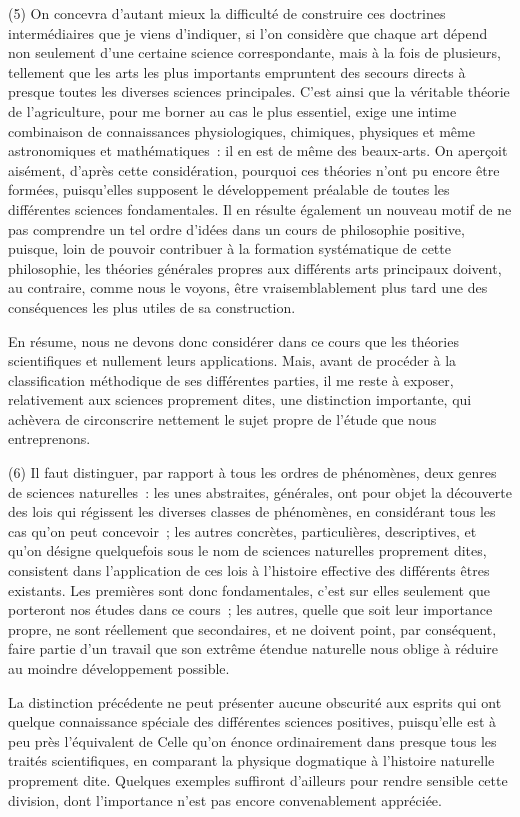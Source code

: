 \documentclass[french,twoside]{book} %
\begin{document}
(5) On concevra d’autant mieux la difficulté de construire ces doctrines intermédiaires que je viens d’indiquer, si l’on considère que chaque art dépend non seulement d’une certaine science correspondante, mais à la fois de plusieurs, tellement que les arts les plus importants empruntent des secours directs à presque toutes les diverses sciences principales. C’est ainsi que la véritable théorie de l’agriculture, pour me borner au cas le plus essentiel, exige une intime combinaison de connaissances physiologiques, chimiques, physiques et même astronomiques et mathématiques : il en est de même des beaux-arts. On aperçoit aisément, d’après cette considération, pourquoi ces théories n’ont pu encore être formées, puisqu’elles supposent le développement préalable de toutes les différentes sciences fondamentales. Il en résulte également un nouveau motif de ne pas comprendre un tel ordre d’idées dans un cours de philosophie positive, puisque, loin de pouvoir contribuer à la formation systématique de cette philosophie, les théories générales propres aux différents arts principaux doivent, au contraire, comme nous le voyons, être vraisemblablement plus tard une des conséquences les plus utiles de sa construction.\par
En résume, nous ne devons donc considérer dans ce cours que les théories scientifiques et nullement leurs applications. Mais, avant de procéder à la classification méthodique de ses différentes parties, il me reste à exposer, relativement aux sciences proprement dites, une distinction importante, qui achèvera de circonscrire nettement le sujet propre de l’étude que nous entreprenons.\par
(6) Il faut distinguer, par rapport à tous les ordres de phénomènes, deux genres de sciences naturelles : les unes abstraites, générales, ont pour objet la découverte des lois qui régissent les diverses classes de phénomènes, en considérant tous les cas qu’on peut concevoir ; les autres concrètes, particulières, descriptives, et qu’on désigne quelquefois sous le nom de sciences naturelles proprement dites, consistent dans l’application de ces lois à l’histoire effective des différents êtres existants. Les premières sont donc fondamentales, c’est sur elles seulement que porteront nos études dans ce cours ; les autres, quelle que soit leur importance propre, ne sont réellement que secondaires, et ne doivent point, par conséquent, faire partie d’un travail que son extrême étendue naturelle nous oblige à réduire au moindre développement possible.\par
La distinction précédente ne peut présenter aucune obscurité aux esprits qui ont quelque connaissance spéciale des différentes sciences positives, puisqu’elle est à peu près l’équivalent de Celle qu’on énonce ordinairement dans presque tous les traités scientifiques, en comparant la physique dogmatique à l’histoire naturelle proprement dite. Quelques exemples suffiront d’ailleurs pour rendre sensible cette division, dont l’importance n’est pas encore convenablement appréciée.\par
\end{document}
